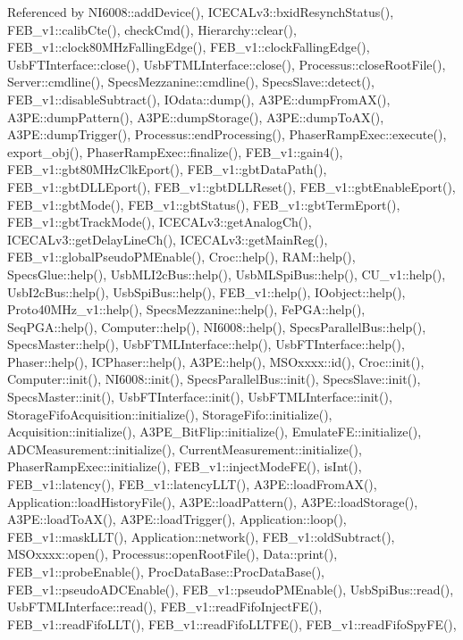 Referenced by N\+I6008\+::add\+Device(), I\+C\+E\+C\+A\+Lv3\+::bxid\+Resynch\+Status(), F\+E\+B\+\_\+v1\+::calib\+Cte(), check\+Cmd(), Hierarchy\+::clear(), F\+E\+B\+\_\+v1\+::clock80\+M\+Hz\+Falling\+Edge(), F\+E\+B\+\_\+v1\+::clock\+Falling\+Edge(), Usb\+F\+T\+Interface\+::close(), Usb\+F\+T\+M\+L\+Interface\+::close(), Processus\+::close\+Root\+File(), Server\+::cmdline(), Specs\+Mezzanine\+::cmdline(), Specs\+Slave\+::detect(), F\+E\+B\+\_\+v1\+::disable\+Subtract(), I\+Odata\+::dump(), A3\+P\+E\+::dump\+From\+A\+X(), A3\+P\+E\+::dump\+Pattern(), A3\+P\+E\+::dump\+Storage(), A3\+P\+E\+::dump\+To\+A\+X(), A3\+P\+E\+::dump\+Trigger(), Processus\+::end\+Processing(), Phaser\+Ramp\+Exec\+::execute(), export\+\_\+obj(), Phaser\+Ramp\+Exec\+::finalize(), F\+E\+B\+\_\+v1\+::gain4(), F\+E\+B\+\_\+v1\+::gbt80\+M\+Hz\+Clk\+Eport(), F\+E\+B\+\_\+v1\+::gbt\+Data\+Path(), F\+E\+B\+\_\+v1\+::gbt\+D\+L\+L\+Eport(), F\+E\+B\+\_\+v1\+::gbt\+D\+L\+L\+Reset(), F\+E\+B\+\_\+v1\+::gbt\+Enable\+Eport(), F\+E\+B\+\_\+v1\+::gbt\+Mode(), F\+E\+B\+\_\+v1\+::gbt\+Status(), F\+E\+B\+\_\+v1\+::gbt\+Term\+Eport(), F\+E\+B\+\_\+v1\+::gbt\+Track\+Mode(), I\+C\+E\+C\+A\+Lv3\+::get\+Analog\+Ch(), I\+C\+E\+C\+A\+Lv3\+::get\+Delay\+Line\+Ch(), I\+C\+E\+C\+A\+Lv3\+::get\+Main\+Reg(), F\+E\+B\+\_\+v1\+::global\+Pseudo\+P\+M\+Enable(), Croc\+::help(), R\+A\+M\+::help(), Specs\+Glue\+::help(), Usb\+M\+L\+I2c\+Bus\+::help(), Usb\+M\+L\+Spi\+Bus\+::help(), C\+U\+\_\+v1\+::help(), Usb\+I2c\+Bus\+::help(), Usb\+Spi\+Bus\+::help(), F\+E\+B\+\_\+v1\+::help(), I\+Oobject\+::help(), Proto40\+M\+Hz\+\_\+v1\+::help(), Specs\+Mezzanine\+::help(), Fe\+P\+G\+A\+::help(), Seq\+P\+G\+A\+::help(), Computer\+::help(), N\+I6008\+::help(), Specs\+Parallel\+Bus\+::help(), Specs\+Master\+::help(), Usb\+F\+T\+M\+L\+Interface\+::help(), Usb\+F\+T\+Interface\+::help(), Phaser\+::help(), I\+C\+Phaser\+::help(), A3\+P\+E\+::help(), M\+S\+Oxxxx\+::id(), Croc\+::init(), Computer\+::init(), N\+I6008\+::init(), Specs\+Parallel\+Bus\+::init(), Specs\+Slave\+::init(), Specs\+Master\+::init(), Usb\+F\+T\+Interface\+::init(), Usb\+F\+T\+M\+L\+Interface\+::init(), Storage\+Fifo\+Acquisition\+::initialize(), Storage\+Fifo\+::initialize(), Acquisition\+::initialize(), A3\+P\+E\+\_\+\+Bit\+Flip\+::initialize(), Emulate\+F\+E\+::initialize(), A\+D\+C\+Measurement\+::initialize(), Current\+Measurement\+::initialize(), Phaser\+Ramp\+Exec\+::initialize(), F\+E\+B\+\_\+v1\+::inject\+Mode\+F\+E(), is\+Int(), F\+E\+B\+\_\+v1\+::latency(), F\+E\+B\+\_\+v1\+::latency\+L\+L\+T(), A3\+P\+E\+::load\+From\+A\+X(), Application\+::load\+History\+File(), A3\+P\+E\+::load\+Pattern(), A3\+P\+E\+::load\+Storage(), A3\+P\+E\+::load\+To\+A\+X(), A3\+P\+E\+::load\+Trigger(), Application\+::loop(), F\+E\+B\+\_\+v1\+::mask\+L\+L\+T(), Application\+::network(), F\+E\+B\+\_\+v1\+::old\+Subtract(), M\+S\+Oxxxx\+::open(), Processus\+::open\+Root\+File(), Data\+::print(), F\+E\+B\+\_\+v1\+::probe\+Enable(), Proc\+Data\+Base\+::\+Proc\+Data\+Base(), F\+E\+B\+\_\+v1\+::pseudo\+A\+D\+C\+Enable(), F\+E\+B\+\_\+v1\+::pseudo\+P\+M\+Enable(), Usb\+Spi\+Bus\+::read(), Usb\+F\+T\+M\+L\+Interface\+::read(), F\+E\+B\+\_\+v1\+::read\+Fifo\+Inject\+F\+E(), F\+E\+B\+\_\+v1\+::read\+Fifo\+L\+L\+T(), F\+E\+B\+\_\+v1\+::read\+Fifo\+L\+L\+T\+F\+E(), F\+E\+B\+\_\+v1\+::read\+Fifo\+Spy\+F\+E(), 